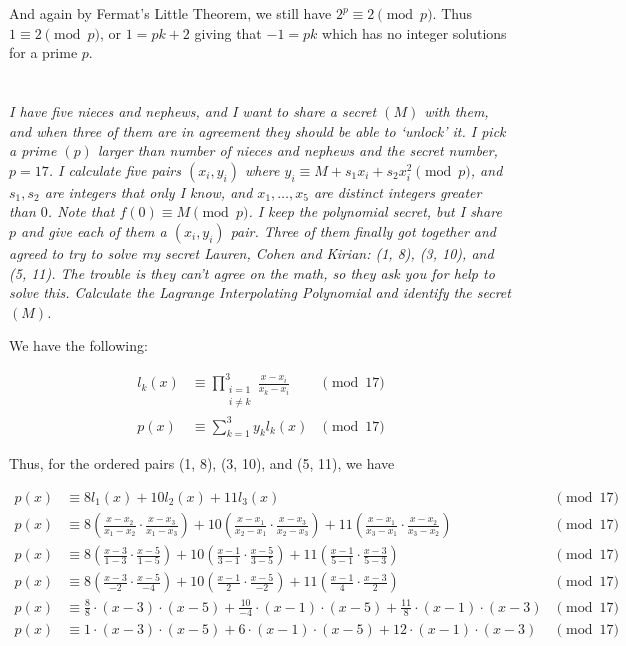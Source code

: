 \documentclass[12pt]{article}
\begin{document}
        And again by Fermat's Little Theorem, we still have $2^p \equiv 2 \pmod{p}$. Thus $1 \equiv 2 \pmod{p}$, or $1 = pk + 2$ giving that $-1 = pk$ which has no integer solutions for a prime $p$.

\section{} \textit{I have five nieces and nephews, and I want to share a secret $(M)$ with them, and when three of them are in agreement they should be able to `unlock' it. I pick a prime $(p)$ larger than number of nieces and nephews and the secret number, $p = 17$. I calculate five pairs $(x_i, y_i)$ where $y_i \equiv M + s_1 x_i + s_2 x_i ^ 2\pmod{p}$, and $s_1, s_2$ are integers that only I know, and $x_1, \dots, x_5$ are distinct integers greater than $0$. Note that $f(0) \equiv M \pmod{p}$. I keep the polynomial secret, but I share $p$ and give each of them a $(x_i, y_i)$ pair. Three of them finally got together and agreed to try to solve my secret Lauren, Cohen and Kirian: (1, 8), (3, 10), and (5, 11). The trouble is they can't agree on the math, so they ask you for help to solve this. Calculate the Lagrange Interpolating Polynomial and identify the secret $(M)$.}

    We have the following:

    \begin{align*}
        l_k(x) &\equiv \prod_{\substack{i = 1 \\ i \neq k}}^3 \frac{x - x_i}{x_k - x_i} &\pmod{17}\\
        p(x) &\equiv \sum_{k = 1}^3 y_k l_k(x) &\pmod{17}
    \end{align*}

    Thus, for the ordered pairs (1, 8), (3, 10), and (5, 11), we have

    \begin{align*}
        p(x) &\equiv 8l_1(x) + 10l_2(x) + 11l_3(x) &\pmod{17}\\
        p(x) &\equiv 8\left(\frac{x - x_2}{x_1 - x_2} \cdot \frac{x - x_3}{x_1 - x_3}\right) + 10\left(\frac{x - x_1}{x_2 - x_1} \cdot \frac{x - x_3}{x_2 - x_3}\right) + 11\left(\frac{x - x_1}{x_3 - x_1} \cdot \frac{x - x_2}{x_3 - x_2}\right) &\pmod{17}\\
        p(x) &\equiv 8\left(\frac{x - 3}{1 - 3} \cdot \frac{x - 5}{1 - 5}\right) + 10\left(\frac{x - 1}{3 - 1} \cdot \frac{x - 5}{3 - 5}\right) + 11\left(\frac{x - 1}{5 - 1} \cdot \frac{x - 3}{5 - 3}\right) &\pmod{17}\\
        p(x) &\equiv 8\left(\frac{x - 3}{-2} \cdot \frac{x - 5}{-4}\right) + 10\left(\frac{x - 1}{2} \cdot \frac{x - 5}{-2}\right) + 11\left(\frac{x - 1}{4} \cdot \frac{x - 3}{2}\right) &\pmod{17}\\
        p(x) &\equiv \frac{8}{8} \cdot (x - 3) \cdot (x - 5) + \frac{10}{-4} \cdot (x - 1) \cdot (x - 5) + \frac{11}{8} \cdot (x - 1) \cdot (x - 3) &\pmod{17}\\
        p(x) &\equiv 1 \cdot (x - 3) \cdot (x - 5) + 6 \cdot (x - 1) \cdot (x - 5) + 12 \cdot (x - 1) \cdot (x - 3) &\pmod{17}\\
    \end{align*}
\end{document}
